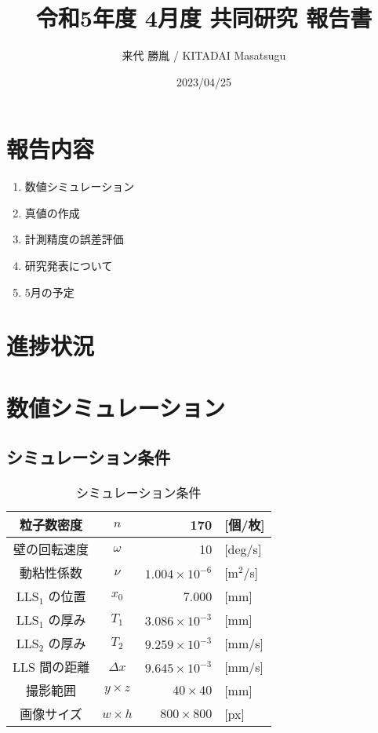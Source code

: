 \documentclass[twocolumn,a4j]{jsarticle}
\author{来代 勝胤 / KITADAI Masatsugu}
\title{令和5年度 4月度 共同研究 報告書}
\date{2023/04/25}
\begin{document}
\columnseprule=0.1mm
\maketitle

\section*{報告内容}
\begin{enumerate}[1.]
    \item 数値シミュレーション
    \item 真値の作成
    \item 計測精度の誤差評価
    \item 研究発表について
    \item 5月の予定
\end{enumerate}
\section*{進捗状況}

\section{数値シミュレーション}

\subsection{シミュレーション条件}
\begin{table}[hbtp]
    \label{table:data_type}
    \caption{シミュレーション条件}
    \centering
    \begin{tabular}{ c c | r l}
        \hline
        粒子数密度              & $n$          & 170                    & [個/枚]            \\ \hline
        壁の回転速度            & $\omega$     & 10                     & [deg/s]            \\ \hline
        動粘性係数              & $\nu$        & $1.004 \times 10^{-6}$ & [$\mathrm{m}^2$/s] \\ \hline
        $\mathrm{LLS}_1$ の位置 & $x_0$        & 7.000                  & [mm]               \\ \hline
        $\mathrm{LLS}_1$ の厚み & $T_1$        & $3.086\times 10^{-3}$  & [mm]               \\ \hline
        $\mathrm{LLS}_2$ の厚み & $T_2$        & $9.259\times 10^{-3}$  & [mm/s]             \\ \hline
        LLS 間の距離            & $\Delta x$   & $9.645\times 10^{-3}$  & [mm/s]             \\ \hline
        撮影範囲                & $y \times z$ & $40 \times 40$         & [mm]               \\ \hline
        画像サイズ              & $w \times h$ & $800 \times 800$       & [px]               \\ \hline
    \end{tabular}
\end{table}
\end{document}
